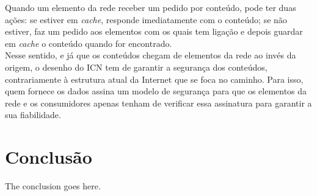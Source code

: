 \documentclass[conference]{IEEEtran}
\begin{document}
Quando um elemento da rede receber um pedido por conte\'{u}do, pode ter duas a\c{c}\~{o}es: se estiver em \textit{cache}, responde imediatamente com o conte\'{u}do; se n\~{a}o estiver, faz um pedido aos elementos com os quais tem liga\c{c}\~{a}o e depois guardar em \textit{cache} o conte\'{u}do quando for encontrado\cite{surveyICN}.\\

Nesse sentido, e j\'{a} que os conte\'{u}dos chegam de elementos da rede ao inv\'{e}s da origem, o desenho do ICN tem de garantir a seguran\c{c}a dos conte\'{u}dos, contrariamente \`{a} estrutura atual da Internet que se foca no caminho. Para isso, quem fornece os dados assina um modelo de seguran\c{c}a para que os elementos da rede e os consumidores apenas tenham de verificar essa assinatura para garantir a sua fiabilidade\cite{icnForest}.\\


\section{Conclus\~{a}o}
The conclusion goes here.\\

\IEEEtriggercmd{\enlargethispage{-5in}}



\end{document}
